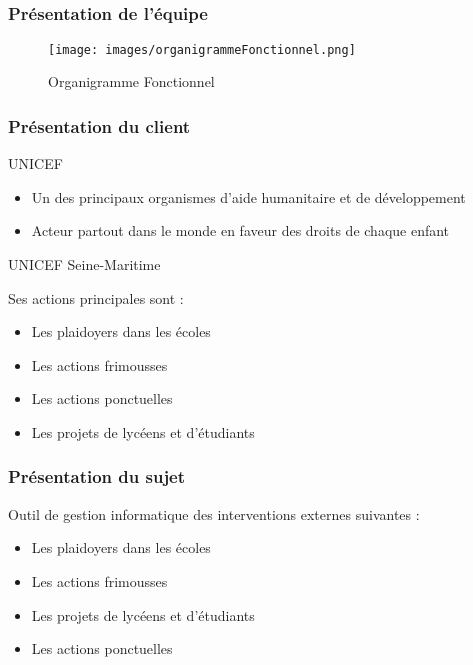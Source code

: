 \subsection{} %

\begin{frame}
\frametitle{Présentation de l'équipe}
	\begin{figure}
		\texttt{[image: images/organigrammeFonctionnel.png]}
		\caption{Organigramme Fonctionnel}
		\label{OF}
	\end{figure}
\end{frame}

\begin{frame}
\frametitle{Présentation du client}
\centering
	\begin{center}
		UNICEF
	\end{center}
	\begin{itemize}
		\item Un des principaux organismes d’aide humanitaire et de développement
		\item Acteur partout dans le monde en faveur des droits de chaque enfant
	\end{itemize}
	
	\begin{center}
		UNICEF Seine-Maritime
	\end{center}
	Ses actions principales sont : 
	\begin{itemize}
		\item Les plaidoyers dans les \'ecoles
		\item Les actions frimousses
		\item Les actions ponctuelles
		\item Les projets de lycéens et d'étudiants
	\end{itemize}
	
\end{frame}
\begin{frame}
\frametitle{Présentation du sujet}
Outil de gestion informatique des interventions externes suivantes :

	\begin{itemize}
		\item Les plaidoyers dans les \'ecoles
		\item Les actions frimousses
		\item Les projets de lycéens et d'étudiants
		\item Les actions ponctuelles
	\end{itemize}
	
\end{frame}